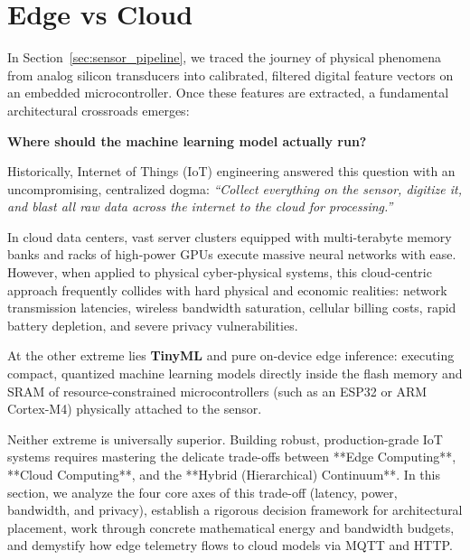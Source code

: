 \section{Edge vs Cloud}\label{sec:edge_vs_cloud}

In Section~\ref{sec:sensor_pipeline}, we traced the journey of physical phenomena from analog silicon transducers into calibrated, filtered digital feature vectors on an embedded microcontroller. Once these features are extracted, a fundamental architectural crossroads emerges:

\begin{center}
\textbf{Where should the machine learning model actually run?}
\end{center}

Historically, Internet of Things (IoT) engineering answered this question with an uncompromising, centralized dogma: \emph{``Collect everything on the sensor, digitize it, and blast all raw data across the internet to the cloud for processing.''}

In cloud data centers, vast server clusters equipped with multi-terabyte memory banks and racks of high-power GPUs execute massive neural networks with ease. However, when applied to physical cyber-physical systems, this cloud-centric approach frequently collides with hard physical and economic realities: network transmission latencies, wireless bandwidth saturation, cellular billing costs, rapid battery depletion, and severe privacy vulnerabilities.

At the other extreme lies \textbf{TinyML} and pure on-device edge inference: executing compact, quantized machine learning models directly inside the flash memory and SRAM of resource-constrained microcontrollers (such as an ESP32 or ARM Cortex-M4) physically attached to the sensor.

Neither extreme is universally superior. Building robust, production-grade IoT systems requires mastering the delicate trade-offs between **Edge Computing**, **Cloud Computing**, and the **Hybrid (Hierarchical) Continuum**. In this section, we analyze the four core axes of this trade-off (latency, power, bandwidth, and privacy), establish a rigorous decision framework for architectural placement, work through concrete mathematical energy and bandwidth budgets, and demystify how edge telemetry flows to cloud models via MQTT and HTTP.

